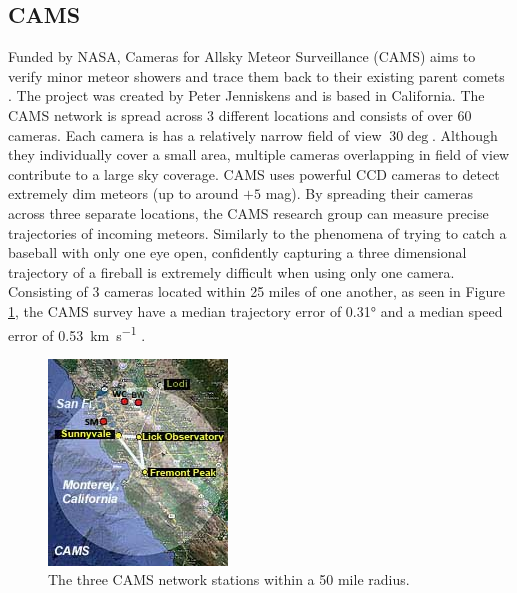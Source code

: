 \subsection{CAMS}
Funded by NASA, Cameras for Allsky Meteor Surveillance (CAMS) aims to verify minor meteor showers and trace them back to their existing parent comets \cite{jenniskens_cams:_2011}.  
The project was created by Peter Jenniskens and is based in California.  
The CAMS network is spread across 3 different locations and consists of over 60 cameras.
Each camera is has a relatively narrow field of view $~30\deg$.
Although they individually cover a small area, multiple cameras overlapping in field of view contribute to a large sky coverage. 
CAMS uses powerful CCD cameras to detect extremely dim meteors (up to around $+5$ mag).
By spreading their cameras across three separate locations, the CAMS research group can measure precise trajectories of incoming meteors. 
Similarly to the phenomena of trying to catch a baseball with only one eye open, confidently capturing a three dimensional trajectory of a fireball is extremely difficult when using only one camera.
Consisting of 3 cameras located within 25 miles of one another, as seen in Figure \ref{trio}, the CAMS survey have a median trajectory error of \ang{0.31} and a median speed error of \SI{0.53}{\kilo\meter\per\second} \cite{jenniskens_cams:_2011}. 

\begin{figure}[ht!]
  \centering
  \includegraphics[scale=0.7]{images/CAMS_trio.jpg}
  \caption{The three CAMS network stations within a 50 mile radius. }
  \label{trio}
\end{figure}


